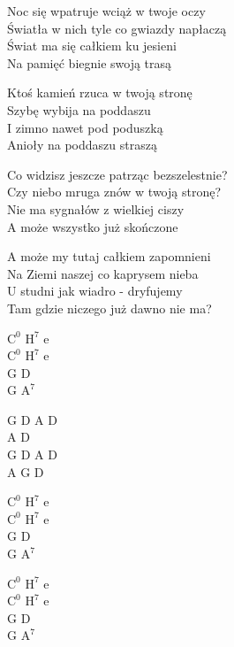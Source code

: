 \begin{text}
    Noc się wpatruje wciąż w twoje oczy\\
    Światła w nich tyle co gwiazdy napłaczą\\
    Świat ma się całkiem ku jesieni\\
    Na pamięć biegnie swoją trasą

    \vin Ktoś kamień rzuca w twoją stronę\\
    \vin Szybę wybija na poddaszu\\
    \vin I zimno nawet pod poduszką\\
    \vin Anioły na poddaszu straszą

    Co widzisz jeszcze patrząc bezszelestnie?\\
    Czy niebo mruga znów w twoją stronę?\\
    Nie ma sygnałów z wielkiej ciszy\\
    A może wszystko już skończone

    A może my tutaj całkiem zapomnieni\\
    Na Ziemi naszej co kaprysem nieba\\
    U studni jak wiadro - dryfujemy\\
    Tam gdzie niczego już dawno nie ma?
\end{text}
\begin{chord}
    $\mathrm{C^0}$ $\mathrm{H^7}$ e\\
    $\mathrm{C^0}$ $\mathrm{H^7}$ e\\
    G D\\
    G $\mathrm{A^7}$

    G D A D\\
    A D\\
    G D A D\\
    A G D

    $\mathrm{C^0}$ $\mathrm{H^7}$ e\\
    $\mathrm{C^0}$ $\mathrm{H^7}$ e\\
    G D\\
    G $\mathrm{A^7}$

    $\mathrm{C^0}$ $\mathrm{H^7}$ e\\
    $\mathrm{C^0}$ $\mathrm{H^7}$ e\\
    G D\\
    G $\mathrm{A^7}$
\end{chord}
